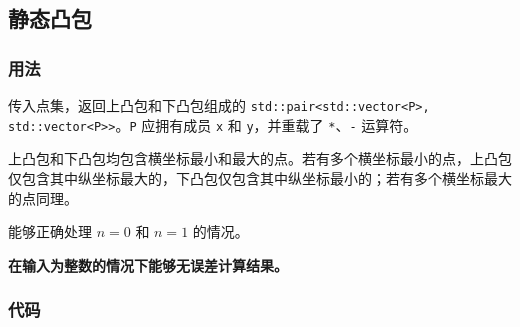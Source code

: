 \subsection{静态凸包}

\subsubsection{用法}

传入点集，返回上凸包和下凸包组成的 \lstinline{std::pair<std::vector<P>, std::vector<P>>}。\lstinline{P} 应拥有成员 \lstinline{x} 和 \lstinline{y}，并重载了 \lstinline{*}、\lstinline{-} 运算符。

上凸包和下凸包均包含横坐标最小和最大的点。若有多个横坐标最小的点，上凸包仅包含其中纵坐标最大的，下凸包仅包含其中纵坐标最小的；若有多个横坐标最大的点同理。

能够正确处理 $n = 0$ 和 $n = 1$ 的情况。

\textbf{在输入为整数的情况下能够无误差计算结果。}

\subsubsection{代码}


